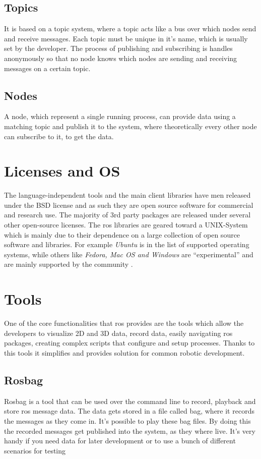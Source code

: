 \subsection{Topics}
It is based on a topic system, where a topic acts like a bus over which nodes send and receive messages. Each topic must be unique in it's name, which is usually set by the developer. The process of publishing and subscribing is handles anonymously so that no node knows which nodes are sending and receiving messages on a certain topic.

\subsection{Nodes}
A node, which represent a single running process, can provide data using a matching topic and publish it to the system, where theoretically every other node can subscribe to it, to get the data. 

\section{Licenses and OS}
The language-independent tools and the main client libraries have men released under the BSD license and as such they are open source software for commercial and research use. The majority of 3rd party packages are released under several other open-source licenses.\newline
The \gls{ros} libraries are geared toward a UNIX-System which is mainly due to their dependence on a large collection of open source software and libraries.
For example \textit{Ubuntu} is in the list of supported operating systems, while others like \textit{Fedora, Mac OS and Windows} are \enquote{experimental} and are mainly supported by the community \cite{isrosforme}.

\section{Tools}
One of the core functionalities that \gls{ros} provides are the tools which allow the developers to visualize 2D and 3D data, record data, easily navigating \gls{ros} packages, creating complex scripts that configure and setup processes. Thanks to this tools it simplifies and provides solution for common robotic development.

\subsection{Rosbag}
Rosbag is a tool that can be used over the command line to record, playback and store \gls{ros} message data. The data gets stored in a file called bag, where it records the messages as they come in. It's possible to play these bag files. By doing this the recorded messages get published into the system, as they where live. It's very handy if you need data for later development or to use a bunch of different scenarios for testing


